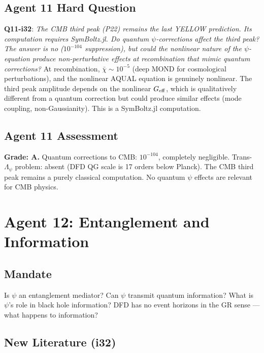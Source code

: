 \documentclass[11pt,a4paper]{article}
\begin{document}
\subsection{Agent 11 Hard Question}

\textbf{Q11-i32}: \emph{The CMB third peak (P22) remains the last YELLOW prediction. Its computation requires SymBoltz.jl. Do quantum $\psi$-corrections affect the third peak? The answer is no ($10^{-104}$ suppression), but could the nonlinear nature of the $\psi$-equation produce non-perturbative effects at recombination that mimic quantum corrections?} At recombination, $\bar\chi \sim 10^{-5}$ (deep MOND for cosmological perturbations), and the nonlinear AQUAL equation is genuinely nonlinear. The third peak amplitude depends on the nonlinear $G_{\rm eff}$, which is qualitatively different from a quantum correction but could produce similar effects (mode coupling, non-Gaussianity). This is a SymBoltz.jl computation.

\subsection{Agent 11 Assessment}

\textbf{Grade: A.} Quantum corrections to CMB: $10^{-104}$, completely negligible. Trans-$\Lambda_\psi$ problem: absent (DFD QG scale is 17 orders below Planck). The CMB third peak remains a purely classical computation. No quantum $\psi$ effects are relevant for CMB physics.


\newpage
\section{Agent 12: Entanglement and Information}
\label{sec:agent12}

\subsection{Mandate}

Is $\psi$ an entanglement mediator? Can $\psi$ transmit quantum information? What is $\psi$'s role in black hole information? DFD has no event horizons in the GR sense --- what happens to information?

\subsection{New Literature (i32)}
\end{document}
